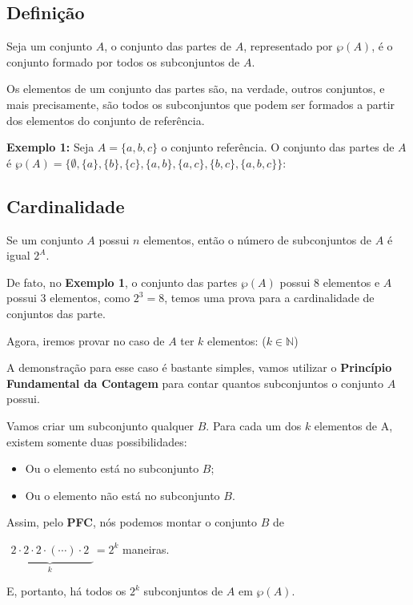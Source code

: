 \subsection{Definição}
Seja um conjunto $A$, o conjunto das partes de $A$, representado por $\wp(A)$, é o conjunto formado por todos os subconjuntos de $A$.

Os elementos de um conjunto das partes são, na verdade, outros conjuntos, e mais precisamente, são todos os subconjuntos que podem ser formados a partir dos elementos do conjunto de referência.

\textbf{Exemplo 1:}  Seja $A = \{a,b,c\}$ o conjunto referência.
O conjunto das partes de $A$ é $\wp(A)
= \{\emptyset,\{a\},\{b\},\{c\},\{a,b\},\{a,c\},\{b,c\},\{a,b,c\}\}$: 

\subsection{Cardinalidade}
Se um conjunto $A$ possui $n$ elementos, então o número de subconjuntos de $A$ é igual $2^A$.

De fato, no \textbf{Exemplo 1}, o conjunto das partes $\wp(A)$ possui 8 elementos e $A$ possui 3 elementos, como $2^3 = 8$, temos uma prova para a cardinalidade de conjuntos das parte.

Agora, iremos provar no caso de $A$ ter $k$ elementos: ($k \in  \mathbb{N}$) 

A demonstração para esse caso é bastante simples, vamos utilizar o \textbf{Princípio Fundamental da Contagem} para contar quantos subconjuntos o conjunto $A$ possui.

Vamos criar um subconjunto qualquer $B$. Para cada um dos $k$ elementos de A, existem somente duas possibilidades:

\begin{itemize}

\item Ou o elemento está no subconjunto $B$;
    
\item Ou o elemento não está no subconjunto $B$.
  
\end{itemize}

Assim, pelo \textbf{PFC}, nós podemos montar o conjunto $B$ de
\begin{center}
    $\underbrace{\begin{matrix} 2\cdot2\cdot2\cdot(\cdots)\cdot2\end{matrix}}_{k} = 2^k$ maneiras.
\end{center}
E, portanto, há todos os $2^k$ subconjuntos de $A$ em $\wp(A)$.


